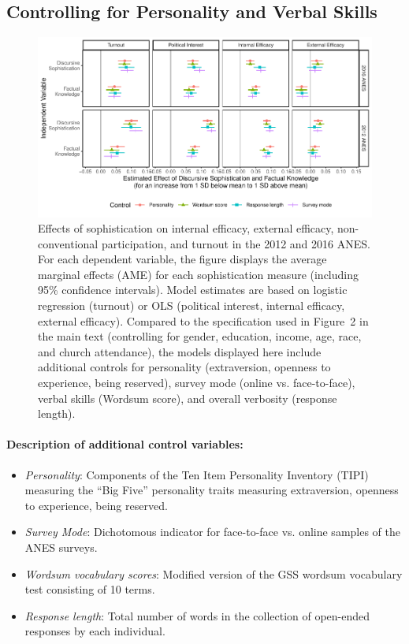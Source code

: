 \clearpage
\subsection{Controlling for Personality and Verbal Skills}\label{app:personality}

\begin{figure}[h]\centering
	\includegraphics{../fig/knoweff_robust.pdf}
	\caption{Effects of sophistication on internal efficacy, external efficacy, non-conventional participation, and turnout in the 2012 and 2016 ANES. For each dependent variable, the figure displays the average marginal effects (AME) for each sophistication measure (including 95\% confidence intervals). Model estimates are based on logistic regression (turnout) or OLS (political interest, internal efficacy, external efficacy). Compared to the specification used in Figure~2 in the main text (controlling for gender, education, income, age, race, and church attendance), the models displayed here include additional controls for personality (extraversion, openness to experience, being reserved), survey mode (online vs. face-to-face), verbal skills (Wordsum score), and overall verbosity (response length).}\label{fig:knoweff_robust}
\end{figure}


\paragraph{Description of additional control variables:}

\begin{itemize}
	\item \textit{Personality}: Components of the Ten Item Personality Inventory (TIPI) measuring the ``Big Five'' personality traits measuring extraversion, openness to experience, being reserved.
	\item \textit{Survey Mode}: Dichotomous indicator for face-to-face vs. online samples of the ANES surveys.
	\item \textit{Wordsum vocabulary scores}: Modified version of the GSS wordsum vocabulary test consisting of 10 terms.
	\item \textit{Response length}: Total number of words in the collection of open-ended responses by each individual.
\end{itemize}

